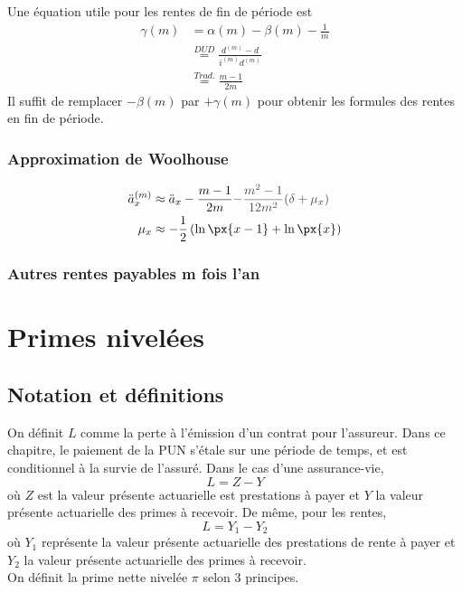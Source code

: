 \documentclass[10pt, french]{article}
\begin{document}
\begin{multicols*}{3}
Une équation utile pour les rentes de fin de période est 
\begin{align*}
	\gamma(m) 
	&=	\alpha(m) - \beta(m) - \frac{1}{m}	\\
	&\overset{DUD}{=} \frac{d^{(m)} - d}{i^{(m)} d^{(m)}}	\\
	&\overset{Trad.}{=} \frac{m - 1}{2m}	
\end{align*}
Il suffit de remplacer $-\beta(m)$ par $+\gamma(m)$ pour obtenir les formules des rentes en fin de période.


\subsubsection*{Approximation de Woolhouse}

\begin{align*}
	\ddot{a}_{x}^{(m)}
	&\approx	\ddot{a}_{x} - \frac{m - 1}{2m} \textcolor{arsenic}{- \frac{m^{2} - 1}{12m^{2}} (\delta + \mu_{x})}	\\
	\mu_{x}
	&\approx		-	\frac{1}{2} \left( \ln \px{x - 1} + \ln \px{x} \right)
\end{align*}


\subsubsection*{\textcolor{amber(sae/ece)}{Autres rentes payables m fois l'an}}


\section{Primes nivelées}
\subsection{Notation et définitions}
On définit $L$ comme la perte à l'émission d'un contrat pour l'assureur. Dans ce chapitre, le paiement de la PUN s'étale sur une période de temps, et est conditionnel  à la survie de l'assuré. Dans le cas d'une assurance-vie,
\[L = Z - Y\]
où $Z$ est la valeur présente actuarielle est prestations à payer et $Y$ la valeur présente actuarielle des primes à recevoir. De même, pour les rentes,
\[L = Y_1 - Y_2\]
où $Y_1$ représente la valeur présente actuarielle des prestations de rente à payer et $Y_2$ la valeur présente actuarielle des primes à recevoir. \\

On définit la prime nette nivelée $\pi$ selon 3 principes. 


\end{multicols*}
\end{document}

